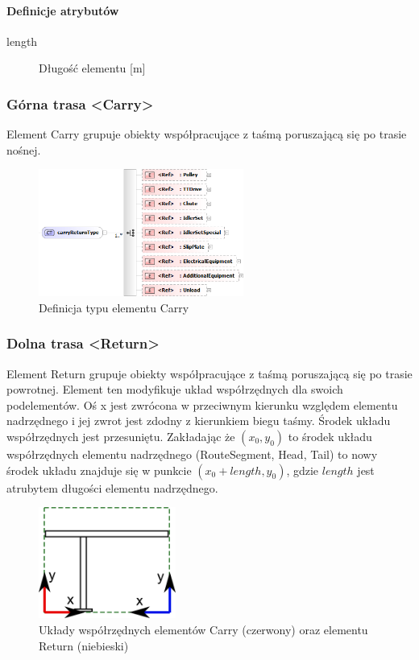 \documentclass[12pt,a4paper]{article}
\begin{document}
\paragraph{Definicje atrybutów}
\begin{description}
\item[length] Długość elementu [m]
\end{description}


\subsubsection{Górna trasa <Carry>}
Element Carry grupuje obiekty współpracujące z taśmą poruszającą się po trasie
nośnej.

\begin{figure}[h]
  \centering
  \includegraphics[width=0.6\textwidth]{png/liquid/carryReturnType}
  \caption{Definicja typu elementu Carry}
  \label{fig:carryReturnType-xsd}
\end{figure}

\subsubsection{Dolna trasa <Return>}
Element Return grupuje obiekty współpracujące z taśmą poruszającą się po trasie
powrotnej. Element ten modyfikuje układ współrzędnych dla swoich podelementów.
Oś x jest zwrócona w przeciwnym kierunku względem elementu nadrzędnego i
jej zwrot jest zdodny z kierunkiem biegu taśmy. Środek układu współrzędnych
jest przesuniętu. Zakładając że $(x_0, y_0)$ to środek układu współrzędnych elementu
nadrzędnego (RouteSegment, Head, Tail) to nowy środek układu znajduje się w
punkcie $(x_0 + {length}, y_0)$, gdzie ${length}$ jest atrubytem długości
elementu nadrzędnego.

\begin{figure}[h]
  \centering
  \includegraphics[width=0.4\textwidth]{png/carryReturn_drw}
  \caption{Układy współrzędnych elementów Carry (czerwony) oraz
elementu Return (niebieski)}
  \label{fig:carryReturn-drw}
\end{figure}
\end{document}
